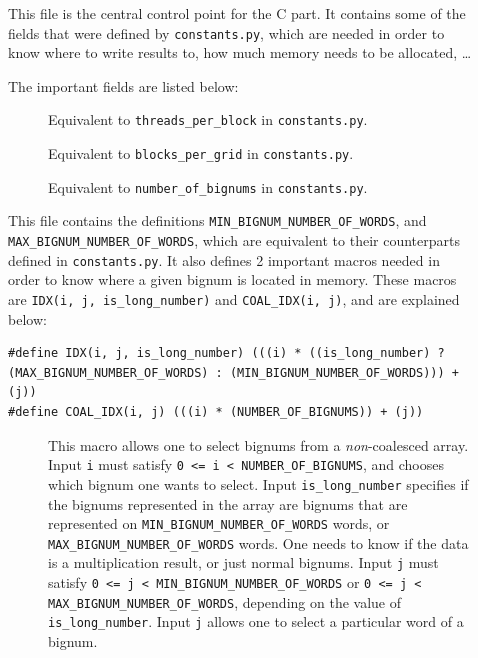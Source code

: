 \documentclass[12pt, a4paper]{report}
\begin{document}
\begin{description}
\item[]
This file is the central control point for the C part.
It contains some of the fields that were defined by \verb+constants.py+, which
are needed in order to know where to write results to, how much memory needs to
be allocated, \ldots

The important fields are listed below:

\begin{description}
\item[] Equivalent to \verb+threads_per_block+ in
\verb+constants.py+.
\item[] Equivalent to \verb+blocks_per_grid+ in
\verb+constants.py+.
\item[] Equivalent to \verb+number_of_bignums+ in
\verb+constants.py+.
\end{description}

\item[]
This file contains the definitions \verb+MIN_BIGNUM_NUMBER_OF_WORDS+, and
\verb+MAX_BIGNUM_NUMBER_OF_WORDS+, which are equivalent to their counterparts defined
in \verb+constants.py+.
It also defines 2 important macros needed in order to know where a given bignum
is located in memory.
These macros are \verb+IDX(i, j, is_long_number)+ and \verb+COAL_IDX(i, j)+, and
are explained below:

\begin{lstlisting}
#define IDX(i, j, is_long_number) (((i) * ((is_long_number) ? (MAX_BIGNUM_NUMBER_OF_WORDS) : (MIN_BIGNUM_NUMBER_OF_WORDS))) + (j))
#define COAL_IDX(i, j) (((i) * (NUMBER_OF_BIGNUMS)) + (j))
\end{lstlisting}

\begin{description}
\item[] This macro allows one to select bignums
from a \emph{non}-coalesced array.
Input \verb+i+ must satisfy
\verb+0 <= i < NUMBER_OF_BIGNUMS+, and chooses which bignum one wants to select.
Input \verb+is_long_number+ specifies if the bignums represented in the array
are bignums that are represented on \verb+MIN_BIGNUM_NUMBER_OF_WORDS+ words,
or \verb+MAX_BIGNUM_NUMBER_OF_WORDS+ words.
One needs to know if the data is a multiplication result, or just normal
bignums.
Input \verb+j+ must satisfy
\verb+0 <= j < MIN_BIGNUM_NUMBER_OF_WORDS+ or
\verb+0 <= j < MAX_BIGNUM_NUMBER_OF_WORDS+, depending on the value of
\verb+is_long_number+.
Input \verb+j+ allows one to select a particular word of a bignum.


\end{description}
\end{description}
\end{document}
